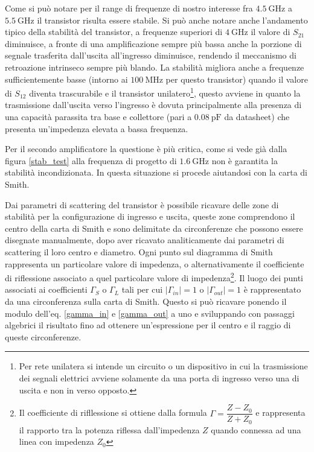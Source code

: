 \documentclass[12pt,oneside]{book}
\begin{document}
Come si può notare per il range di frequenze di nostro interesse fra $\SI{4.5}{\giga\hertz}$ a $\SI{5.5}{\giga\hertz}$ il transistor risulta essere stabile. Si può anche notare anche l'andamento tipico della stabilità del transistor, a frequenze superiori di $\SI{4}{\giga\hertz}$ il valore di $S_{21}$ diminuisce, a fronte di una amplificazione sempre più bassa anche la porzione di segnale trasferita dall'uscita all'ingresso diminuisce, rendendo il meccanismo di retroazione intrinseco sempre più blando. La stabilità migliora anche a frequenze sufficientemente basse (intorno ai $\SI{100}{\mega\hertz}$ per questo transistor) quando il valore di $S_{12}$ diventa trascurabile e il transistor unilatero\footnote{Per rete unilatera si intende un circuito o un dispositivo in cui la trasmissione dei segnali elettrici avviene solamente da una porta di ingresso verso una di uscita e non in verso opposto.}, questo avviene in quanto la trasmissione dall'uscita verso l'ingresso è dovuta principalmente alla presenza di una capacità parassita tra base e collettore (pari a $\SI{0.08}{\pico\farad}$ da datasheet) che presenta un'impedenza elevata a bassa frequenza.

Per il secondo amplificatore la questione è più critica, come si vede già dalla figura \ref{stab_test} alla frequenza di progetto di $\SI{1.6}{\giga\hertz}$ non è garantita la stabilità incondizionata. In questa situazione si procede aiutandosi con la carta di Smith.

Dai parametri di scattering del transistor è possibile ricavare delle zone di stabilità per la configurazione di ingresso e uscita, queste zone comprendono il centro della carta di Smith e sono delimitate da circonferenze che possono essere disegnate manualmente, dopo aver ricavato analiticamente dai parametri di scattering il loro centro e diametro.
Ogni punto sul diagramma di Smith rappresenta un particolare valore di impedenza, o alternativamente il coefficiente di riflessione associato a quel particolare valore di impedenza\footnote{Il coefficiente di rifllessione si ottiene dalla formula $\Gamma=\dfrac{Z-Z_0}{Z+Z_0}$ e rappresenta il rapporto tra la potenza riflessa dall'impedenza $Z$ quando connessa ad una linea con impedenza $Z_0$}. Il luogo dei punti associati ai coefficienti $\Gamma_{S}$ o $\Gamma_{L}$ tali per cui $|\Gamma_{in}| = 1$ o $|\Gamma_{out}| = 1$ è rappresentato da una circonferenza sulla carta di Smith. Questo si può ricavare ponendo il modulo dell'eq. \eqref{gamma_in} e \eqref{gamma_out} a uno e sviluppando con passaggi algebrici il risultato fino ad ottenere un'espressione per il centro e il raggio di queste circonferenze.
\end{document}
